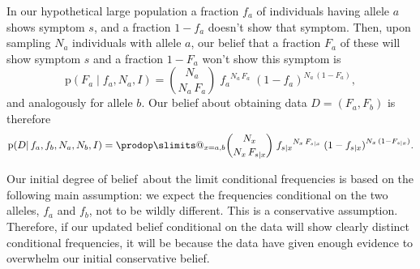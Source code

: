 \documentclass[\ifafour a4paper,12pt,\else a5paper,10pt,\fi%
onecolumn,oneside,article,%
british%
]{memoir}
\makeatletter
\theoremstyle{remark}
\theoremstyle{innote}
\def\prod{\DOTSI\prodop\slimits@}
\newcommand*{\pf}{\mathrm{p}}%
\renewcommand*{\|}{\mathpunct{|}}
\newcommand*{\dob}{degree of belief}
\newcommand*{\yD}{D}
\newcommand*{\yI}{I}
\newcommand*{\ya}{a}
\newcommand*{\yb}{b}
\newcommand*{\ysS}{s}%
\makeatother
\begin{document}
In our hypothetical large population a fraction $f_{\ya}$ of
individuals having allele $\ya$ shows symptom $\ysS$, and a fraction
$1-f_{\ya}$ doesn't show that symptom. Then, upon sampling $N_{\ya}$
individuals with allele $\ya$, our belief that a fraction $F_{\ya}$
of these will show symptom $\ysS$ and a fraction $1-F_{\ya}$ won't
show this symptom is
\begin{equation}
  \label{eq:sampling_belief}
  \pf( F_{\ya} \| f_{\ya},  N_{\ya}, \yI)
  =
\binom{N_{\ya}}{N_{\ya}\,F_{\ya}}\;  {f_{\ya}}^{N_{\ya}\,F_{\ya}} \;
  {(1-f_{\ya})}^{N_{\ya}\,(1-F_{\ya})},
\end{equation}
and analogously for allele $\yb$. Our belief about obtaining data
$\yD = (F_{\ya}, F_{\yb})$ is therefore
\begin{equation}
  \label{eq:sampling_belief_combined}
  \pf(\yD \|  f_{\ya},f_{\yb}, N_{\ya}, N_{\yb}, \yI)
  =
 \prod_{x=\ya,\yb} \binom{N_{x}}{N_{x}\,F_{\ysS\|x}}\;{f_{\ysS\|x}}^{N_{x}\,F_{\ysS\|x}} \;
  {(1-f_{\ysS\|x})}^{N_{x}\,(1-F_{\ysS\|x})}.
\end{equation}

\medskip

Our initial \dob\ about the limit conditional frequencies is based on the
following main assumption: we expect the frequencies conditional on the two
alleles, $f_{\ya}$ and $f_{\yb}$, not to be wildly different.
This is a conservative assumption. Therefore, if our updated belief
conditional on the data will show clearly distinct conditional frequencies,
it will be because the data have given enough evidence to overwhelm our
initial conservative belief.
\end{document}
